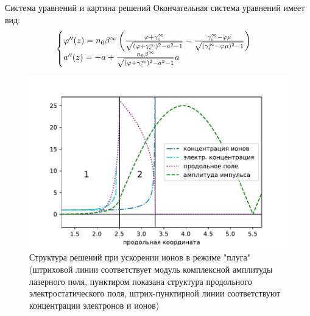 \begin{frame}[t]{}
\begin{columns}[t]
\begin{column}{.48\linewidth}
\begin{block}{Система уравнений и картина решений}
  Окончательная система уравнений имеет вид:
\begin{equation}
\begin{cases}
    \varphi''(z)=n_0\beta^{\infty}\left({{\varphi+\gamma_e^{\infty}}\over{\sqrt{{{(\varphi+\gamma_e^{\infty})^2-a^2-1}}}}}-{{\gamma_i^{\infty}-\varphi\mu}\over{\sqrt{(\gamma_i^{\infty}-\varphi\mu)^2-1}}}\right) \\
    a''(z)=-a+{{n_0\beta^{\infty}}\over{\sqrt{(\varphi+\gamma_e^{\infty})^2-a^2-1}}}a \\
\end{cases}
\end{equation}

        \begin{figure}[h]
            \begin{minipage}{0.5\linewidth}

                \includegraphics[width=\linewidth]{pic/3jstruct.pdf}
                
            \end{minipage}
            
            \caption{Структура решений при ускорении ионов в режиме "плуга" (штриховой линии соответствует модуль комплексной амплитуды лазерного поля, пунктиром показана структура продольного электростатического поля, штрих-пунктирной линии соответствуют концентрации электронов и ионов)}
        \end{figure}

        
      
            


        \end{block}
        

\end{column}
\end{columns}
\end{frame}
